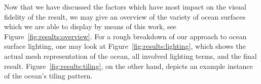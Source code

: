 Now that we have discussed the factors which have most impact on the visual
fidelity of the result, we may give an overview of the variety of
ocean surfaces which we are able to display by means of this work, see
Figure~\ref{fig:results:overview}.
For a rough breakdown of our approach to ocean surface lighting,
one may look at Figure~\ref{fig:results:lighting},
which shows the actual mesh representation of the ocean, all involved
lighting terms, and the final result.
Figure~\ref{fig:results:tiling}, on the other hand, depicts an example
instance of the ocean's tiling pattern. 





%

